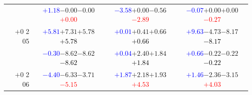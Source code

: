 \documentclass[compress]{beamer}
\begin{document}
\begin{frame}
\begin{tabular}{r | c | c | c}
          & \textcolor{blue}{$+1.18$}\hspace{0.1 cm}$-0.00$\hspace{0.1 cm}$-0.00$\hspace{0.1 cm}\textcolor{red}{$+0.00$} & \textcolor{blue}{$-3.58$}\hspace{0.1 cm}$+0.00$\hspace{0.1 cm}$-0.56$\hspace{0.1 cm}\textcolor{red}{$-2.89$} & \textcolor{blue}{$-0.07$}\hspace{0.1 cm}$+0.00$\hspace{0.1 cm}$+0.00$\hspace{0.1 cm}\textcolor{red}{$-0.27$} \\
$+$0 2 05 & \textcolor{blue}{$+5.81$}\hspace{0.1 cm}$+7.31$\hspace{0.1 cm}$+5.78$\hspace{0.1 cm}\textcolor{black}{$+5.78$} & \textcolor{blue}{$+0.01$}\hspace{0.1 cm}$+0.41$\hspace{0.1 cm}$+0.66$\hspace{0.1 cm}\textcolor{black}{$+0.66$} & \textcolor{blue}{$+9.63$}\hspace{0.1 cm}$-4.73$\hspace{0.1 cm}$-8.17$\hspace{0.1 cm}\textcolor{black}{$-8.17$} \\
          & \textcolor{blue}{$-0.30$}\hspace{0.1 cm}$-8.62$\hspace{0.1 cm}$-8.62$\hspace{0.1 cm}\textcolor{black}{$-8.62$} & \textcolor{blue}{$+0.04$}\hspace{0.1 cm}$+2.40$\hspace{0.1 cm}$+1.84$\hspace{0.1 cm}\textcolor{black}{$+1.84$} & \textcolor{blue}{$+0.66$}\hspace{0.1 cm}$-0.22$\hspace{0.1 cm}$-0.22$\hspace{0.1 cm}\textcolor{black}{$-0.22$} \\
$+$0 2 06 & \textcolor{blue}{$-4.40$}\hspace{0.1 cm}$-6.33$\hspace{0.1 cm}$-3.71$\hspace{0.1 cm}\textcolor{red}{$-5.15$} & \textcolor{blue}{$+1.87$}\hspace{0.1 cm}$+2.18$\hspace{0.1 cm}$+1.93$\hspace{0.1 cm}\textcolor{red}{$+4.53$} & \textcolor{blue}{$+1.46$}\hspace{0.1 cm}$-2.36$\hspace{0.1 cm}$-3.15$\hspace{0.1 cm}\textcolor{red}{$+4.03$} \\

\end{tabular}
\end{frame}
\end{document}
